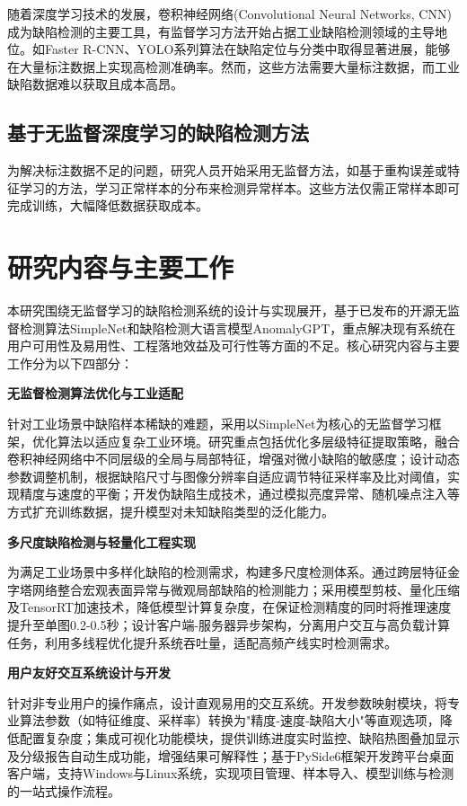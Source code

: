 \documentclass[
  ]{njuthesis}
\begin{document}
随着深度学习技术的发展，卷积神经网络(Convolutional Neural Networks, CNN)成为缺陷检测的主要工具，有监督学习方法开始占据工业缺陷检测领域的主导地位。如Faster R-CNN、YOLO系列算法在缺陷定位与分类中取得显著进展，能够在大量标注数据上实现高检测准确率。然而，这些方法需要大量标注数据，而工业缺陷数据难以获取且成本高昂。

\subsection{基于无监督深度学习的缺陷检测方法}

为解决标注数据不足的问题，研究人员开始采用无监督方法，如基于重构误差或特征学习的方法，学习正常样本的分布来检测异常样本。这些方法仅需正常样本即可完成训练，大幅降低数据获取成本。

\section{研究内容与主要工作}

本研究围绕无监督学习的缺陷检测系统的设计与实现展开，基于已发布的开源无监督检测算法SimpleNet和缺陷检测大语言模型AnomalyGPT，重点解决现有系统在用户可用性及易用性、工程落地效益及可行性等方面的不足。核心研究内容与主要工作分为以下四部分：  

\textbf{无监督检测算法优化与工业适配}  

针对工业场景中缺陷样本稀缺的难题，采用以SimpleNet为核心的无监督学习框架，优化算法以适应复杂工业环境。研究重点包括优化多层级特征提取策略，融合卷积神经网络中不同层级的全局与局部特征，增强对微小缺陷的敏感度；设计动态参数调整机制，根据缺陷尺寸与图像分辨率自适应调节特征采样率及比对阈值，实现精度与速度的平衡；开发伪缺陷生成技术，通过模拟亮度异常、随机噪点注入等方式扩充训练数据，提升模型对未知缺陷类型的泛化能力。  

\textbf{多尺度缺陷检测与轻量化工程实现}  

为满足工业场景中多样化缺陷的检测需求，构建多尺度检测体系。通过跨层特征金字塔网络整合宏观表面异常与微观局部缺陷的检测能力；采用模型剪枝、量化压缩及TensorRT加速技术，降低模型计算复杂度，在保证检测精度的同时将推理速度提升至单图0.2-0.5秒；设计客户端-服务器异步架构，分离用户交互与高负载计算任务，利用多线程优化提升系统吞吐量，适配高频产线实时检测需求。  

\textbf{用户友好交互系统设计与开发}  

针对非专业用户的操作痛点，设计直观易用的交互系统。开发参数映射模块，将专业算法参数（如特征维度、采样率）转换为"精度-速度-缺陷大小"等直观选项，降低配置复杂度；集成可视化功能模块，提供训练进度实时监控、缺陷热图叠加显示及分级报告自动生成功能，增强结果可解释性；基于PySide6框架开发跨平台桌面客户端，支持Windows与Linux系统，实现项目管理、样本导入、模型训练与检测的一站式操作流程。  
\end{document}
